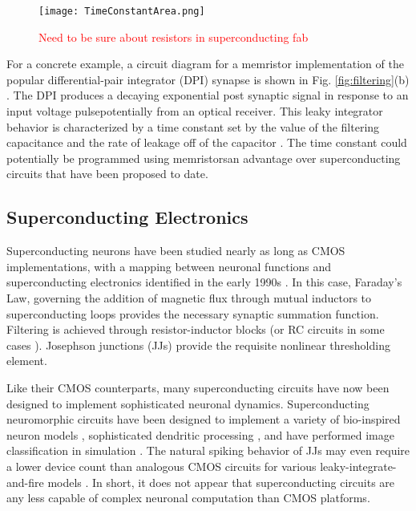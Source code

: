 \documentclass[twocolumn]{article}
\begin{document}
\begin{figure}
    \centering
    \texttt{[image: TimeConstantArea.png]}
    \caption{\textcolor{Red}{Need to be sure about resistors in superconducting fab}}
    \label{fig:TimeConstant}
\end{figure}

For a concrete example, a circuit diagram for a memristor implementation of the popular differential-pair integrator (DPI) synapse is shown in Fig. \ref{fig:filtering}(b) \cite{dalgaty2019hybrid}. The DPI produces a decaying exponential post synaptic signal in response to an input voltage pulse\textemdash potentially from an optical receiver. This leaky integrator behavior is characterized by a time constant set by the value of the filtering capacitance and the rate of leakage off of the capacitor \cite{chicca2014neuromorphic}. The time constant could potentially be programmed using memristors\textemdash an advantage over superconducting circuits that have been proposed to date.

\subsection{Superconducting Electronics}
Superconducting neurons have been studied nearly as long as CMOS implementations, with a mapping between neuronal functions and superconducting electronics identified in the early 1990s \cite{hago1991, hiak1991}. In this case, Faraday's Law, governing the addition of magnetic flux through mutual inductors to superconducting loops provides the necessary synaptic summation function. Filtering is achieved through resistor-inductor blocks (or RC circuits in some cases \cite{crotty2010josephson}). Josephson junctions (JJs) provide the requisite nonlinear thresholding element.

Like their CMOS counterparts, many superconducting circuits have now been designed to implement sophisticated neuronal dynamics. Superconducting neuromorphic circuits have been designed to implement a variety of bio-inspired neuron models \cite{crotty2010josephson, toomey2019design, schneider2018tutorial}, sophisticated dendritic processing \cite{shainline2019fluxonic}, and have performed image classification in simulation \cite{schneider2017energy}. The natural spiking behavior of JJs may even require a lower device count than analogous CMOS circuits for various leaky-integrate-and-fire models \cite{crotty2010josephson}. In short, it does not appear that superconducting circuits are any less capable of complex neuronal computation than CMOS platforms.
\end{document}
